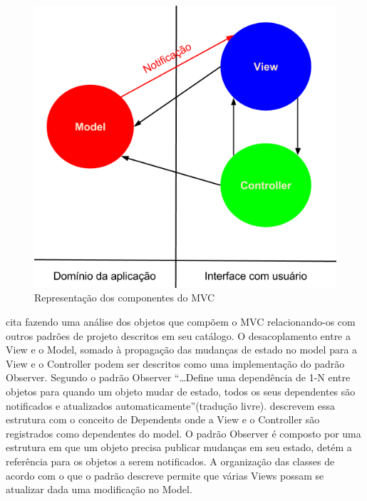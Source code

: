 \begin{figure}[htb]
	\caption{\label{mvc}Representação dos componentes do MVC}
	\begin{center}
		\includegraphics[scale=0.5]{img/mvc.png}
	\end{center}
\end{figure}

 cita  fazendo uma análise dos
objetos que compõem o MVC relacionando-os com outros padrões de projeto
descritos em seu catálogo.
O desacoplamento entre a View e o Model, somado à propagação das mudanças de
estado no model para a View e o Controller podem ser
descritos como uma implementação do padrão Observer. Segundo \cite{gof} o padrão
Observer ``\ldots Define uma dependência de 1-N entre objetos para quando um
objeto mudar de estado, todos os seus dependentes são notificados e atualizados
automaticamente''(tradução livre).  descrevem essa
estrutura com o conceito de Dependents onde a View e o Controller são
registrados como dependentes do model. O padrão Observer é composto por uma
estrutura em que um objeto precisa publicar mudanças em seu estado, detém a
referência para os objetos a serem notificados. A organização das classes de
acordo com o que o padrão descreve permite que várias Views possam se atualizar
dada uma modificação no Model.

